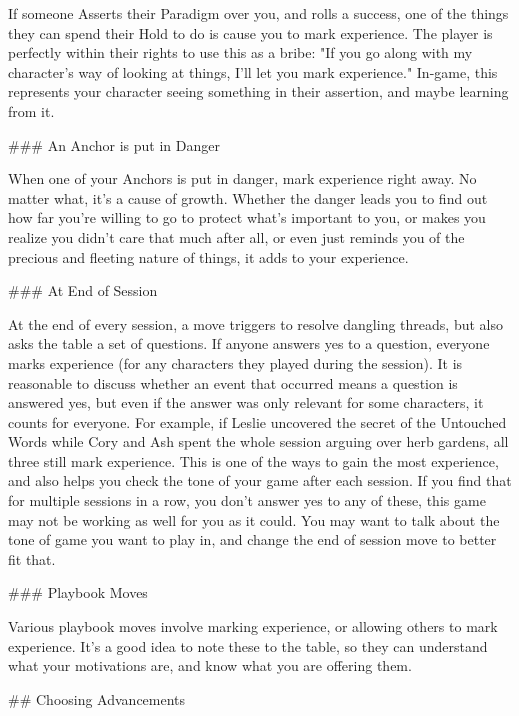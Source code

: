 \documentclass[
  oneside,
  statementpaper,
  9pt]{memoir}
\begin{document}
\begin{Player}
If someone Asserts their Paradigm over you, and rolls a success, one of the things they can spend their Hold to do is cause you to mark experience. The player is perfectly within their rights to use this as a bribe: "If you go along with my character’s way of looking at things, I’ll let you mark experience." In-game, this represents your character seeing something in their assertion, and maybe learning from it.

### An Anchor is put in Danger

When one of your Anchors is put in danger, mark experience right away. No matter what, it’s a cause of growth. Whether the danger leads you to find out how far you’re willing to go to protect what’s important to you, or makes you realize you didn’t care that much after all, or even just reminds you of the precious and fleeting nature of things, it adds to your experience.

### At End of Session

At the end of every session, a move triggers to resolve dangling threads, but also asks the table a set of questions. If anyone answers yes to a question, everyone marks experience (for any characters they played during the session). It is reasonable to discuss whether an event that occurred means a question is answered yes, but even if the answer was only relevant for some characters, it counts for everyone. For example, if Leslie uncovered the secret of the Untouched Words while Cory and Ash spent the whole session arguing over herb gardens, all three still mark experience. This is one of the ways to gain the most experience, and also helps you check the tone of your game after each session. If you find that for multiple sessions in a row, you don't answer yes to any of these, this game may not be working as well for you as it could. You may want to talk about the tone of game you want to play in, and change the end of session move to better fit that.

### Playbook Moves

Various playbook moves involve marking experience, or allowing others to mark experience. It’s a good idea to note these to the table, so they can understand what your motivations are, and know what you are offering them.

## Choosing Advancements


\end{Player}
\end{document}
